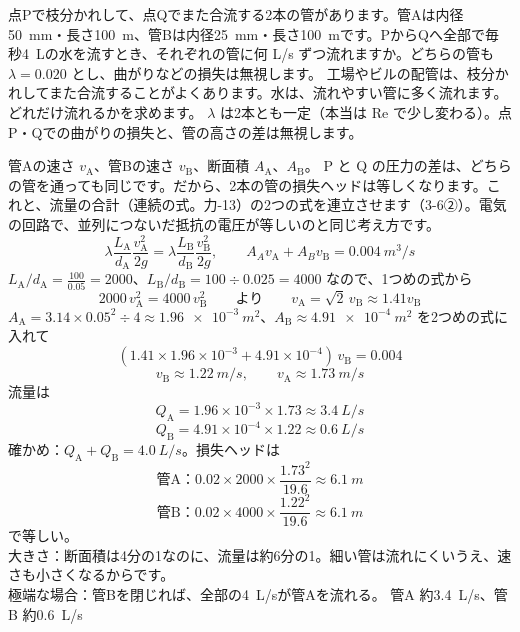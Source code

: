 \begin{phreidai}\label{ph:力-14:ex14}
点Pで枝分かれして、点Qでまた合流する2本の管があります。管Aは内径\qty{50}{mm}・長さ\qty{100}{m}、管Bは内径\qty{25}{mm}・長さ\qty{100}{m}です。PからQへ全部で毎秒\qty{4}{L}の水を流すとき、それぞれの管に何 L/s ずつ流れますか。どちらの管も $\lambda=0.020$ とし、曲がりなどの損失は無視します。
\phbamen
工場やビルの配管は、枝分かれしてまた合流することがよくあります。水は、流れやすい管に多く流れます。どれだけ流れるかを求めます。
\phmushi
$\lambda$ は2本とも一定（本当は Re で少し変わる）。点P・Qでの曲がりの損失と、管の高さの差は無視します。
\phzu
\begin{center}
\end{center}
管Aの速さ $v_{\mathrm A}$、管Bの速さ $v_{\mathrm B}$、断面積 $A_{\mathrm A}$、$A_{\mathrm B}$。
\phriyu
P と Q の圧力の差は、どちらの管を通っても同じです。だから、2本の管の損失ヘッドは等しくなります。これと、流量の合計（連続の式。力-13）の2つの式を連立させます（3-6②）。電気の回路で、並列につないだ抵抗の電圧が等しいのと同じ考え方です。
\phtateru
\[\lambda\frac{L_{\mathrm A}}{d_{\mathrm A}}\frac{v_{\mathrm A}^2}{2g}=\lambda\frac{L_{\mathrm B}}{d_{\mathrm B}}\frac{v_{\mathrm B}^2}{2g},\qquad A_Av_{\mathrm A}+A_Bv_{\mathrm B}=\qty{0.004}{m^3/s}\]
\phtoku
$L_{\mathrm A}/d_{\mathrm A}=\tfrac{100}{0.05}=2000$、$L_{\mathrm B}/d_{\mathrm B}=100\div 0.025=4000$ なので、1つめの式から
\[2000\,v_{\mathrm A}^2=4000\,v_{\mathrm B}^2\qquad\text{より}\qquad v_{\mathrm A}=\sqrt2\,v_{\mathrm B}\approx1.41v_{\mathrm B}\]
$A_{\mathrm A}=3.14\times0.05^2\div 4\approx\qty{1.96e-3}{m^2}$、$A_{\mathrm B}\approx\qty{4.91e-4}{m^2}$ を2つめの式に入れて
\[(1.41\times1.96\times10^{-3}+4.91\times10^{-4})\,v_{\mathrm B}=0.004\]
\[v_{\mathrm B}\approx\qty{1.22}{m/s},\qquad v_{\mathrm A}\approx\qty{1.73}{m/s}\]
流量は
\[Q_{\mathrm A}=1.96\times10^{-3}\times1.73\approx\qty{3.4}{L/s}\]
\[Q_{\mathrm B}=4.91\times10^{-4}\times1.22\approx\qty{0.6}{L/s}\]
\phtashikame
確かめ：$Q_{\mathrm A}+Q_{\mathrm B}=\qty{4.0}{L/s}$。損失ヘッドは
\[\text{管A}：0.02\times2000\times\frac{1.73^2}{19.6}\approx\qty{6.1}{m}\]
\[\text{管B}：0.02\times4000\times\frac{1.22^2}{19.6}\approx\qty{6.1}{m}\]
で等しい。\\
大きさ：断面積は4分の1なのに、流量は約6分の1。細い管は流れにくいうえ、速さも小さくなるからです。\\
極端な場合：管Bを閉じれば、全部の\qty{4}{L/s}が管Aを流れる。
\kotae 管A 約\qty{3.4}{L/s}、管B 約\qty{0.6}{L/s}
\end{phreidai}
